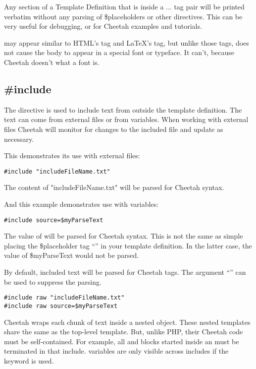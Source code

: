 Any section of a Template Definition that is inside a  ...
 tag pair will be printed verbatim without any parsing of
\$placeholders or other directives. This can be very useful for debugging, or
for Cheetah examples and tutorials.

 may appear similar to HTML's  tag and LaTeX's
\code{\\verbatim\{\}} tag, but unlike those tags,  does not cause
the body to appear in a special font or typeface.  It can't, because Cheetah
doesn't what a font is.  


\subsection{\#include}
\label{output.include}

The  directive is  used to include text from outside the
template definition.  The text can come from external files or from
 variables.  When working with external files Cheetah will
monitor for changes to the included file and update as necessary.  

This demonstrates its use with external files:
\begin{verbatim}
#include "includeFileName.txt"
\end{verbatim}
The content of "includeFileName.txt" will be parsed for Cheetah syntax.

And this example demonstrates use with  variables:
\begin{verbatim}
#include source=$myParseText
\end{verbatim}
The value of  will be parsed for Cheetah syntax. This is not
the same as simple placing the \$placeholder tag ``'' in
your template definition.  In the latter case, the value of \$myParseText would
not be parsed.

By default, included text will be parsed for Cheetah tags.  The argument
``'' can be used to suppress the parsing.

\begin{verbatim}
#include raw "includeFileName.txt"
#include raw source=$myParseText
\end{verbatim}

Cheetah wraps each chunk of  text inside a nested
 object.  These nested templates share the same 
as the top-level template. But, unlike PHP, their Cheetah code must be
self-contained.  For example, all  and  blocks started
inside an  must be terminated in that include. 
variables are only visible across includes if the  keyword is
used.


